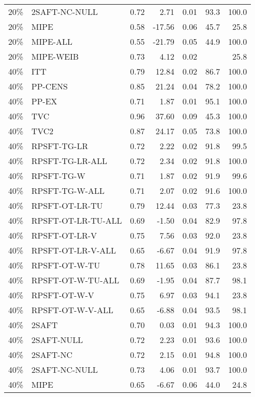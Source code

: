 \begin{table}[ht]
{\begin{tabular}{llrrrrr}
  20\% & 2SAFT-NC-NULL & 0.72 & 2.71 & 0.01 & 93.3 & 100.0 \\ 
  20\% & MIPE & 0.58 & -17.56 & 0.06 & 45.7 & 25.8 \\ 
  20\% & MIPE-ALL & 0.55 & -21.79 & 0.05 & 44.9 & 100.0 \\ 
  20\% & MIPE-WEIB & 0.73 & 4.12 & 0.02 &  & 25.8 \\ 
   \hline
40\% & ITT & 0.79 & 12.84 & 0.02 & 86.7 & 100.0 \\ 
  40\% & PP-CENS & 0.85 & 21.24 & 0.04 & 78.2 & 100.0 \\ 
  40\% & PP-EX & 0.71 & 1.87 & 0.01 & 95.1 & 100.0 \\ 
  40\% & TVC & 0.96 & 37.60 & 0.09 & 45.3 & 100.0 \\ 
  40\% & TVC2 & 0.87 & 24.17 & 0.05 & 73.8 & 100.0 \\ 
   \hline
40\% & RPSFT-TG-LR & 0.72 & 2.22 & 0.02 & 91.8 & 99.5 \\ 
  40\% & RPSFT-TG-LR-ALL & 0.72 & 2.34 & 0.02 & 91.8 & 100.0 \\ 
  40\% & RPSFT-TG-W & 0.71 & 1.87 & 0.02 & 91.9 & 99.6 \\ 
  40\% & RPSFT-TG-W-ALL & 0.71 & 2.07 & 0.02 & 91.6 & 100.0 \\ 
  40\% & RPSFT-OT-LR-TU & 0.79 & 12.44 & 0.03 & 77.3 & 23.8 \\ 
  40\% & RPSFT-OT-LR-TU-ALL & 0.69 & -1.50 & 0.04 & 82.9 & 97.8 \\ 
  40\% & RPSFT-OT-LR-V & 0.75 & 7.56 & 0.03 & 92.0 & 23.8 \\ 
  40\% & RPSFT-OT-LR-V-ALL & 0.65 & -6.67 & 0.04 & 91.9 & 97.8 \\ 
   \hline
40\% & RPSFT-OT-W-TU & 0.78 & 11.65 & 0.03 & 86.1 & 23.8 \\ 
  40\% & RPSFT-OT-W-TU-ALL & 0.69 & -1.95 & 0.04 & 87.7 & 98.1 \\ 
  40\% & RPSFT-OT-W-V & 0.75 & 6.97 & 0.03 & 94.1 & 23.8 \\ 
  40\% & RPSFT-OT-W-V-ALL & 0.65 & -6.88 & 0.04 & 93.5 & 98.1 \\ 
   \hline
40\% & 2SAFT & 0.70 & 0.03 & 0.01 & 94.3 & 100.0 \\ 
  40\% & 2SAFT-NULL & 0.72 & 2.23 & 0.01 & 93.6 & 100.0 \\ 
  40\% & 2SAFT-NC & 0.72 & 2.15 & 0.01 & 94.8 & 100.0 \\ 
  40\% & 2SAFT-NC-NULL & 0.73 & 4.06 & 0.01 & 93.7 & 100.0 \\ 
  40\% & MIPE & 0.65 & -6.67 & 0.06 & 44.0 & 24.8 \\ 

\end{tabular}}
\end{table}

